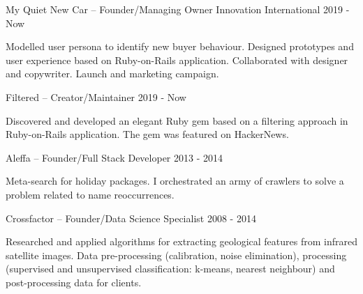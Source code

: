 


\begin{cventries}

  \cventry
    {My Quiet New Car – Founder/Managing Owner} %
    {Innovation} %
    {International} %
    {2019 - Now} %
    {
      \begin{cvitems} %
        \item {Modelled user persona to identify new buyer behaviour. Designed prototypes and user experience based on Ruby-on-Rails application. Collaborated with designer and copywriter. Launch and marketing campaign.}
      \end{cvitems}
    }

    \cventry
    {Filtered – Creator/Maintainer} %
    {} %
    {} %
    {2019 - Now} %
    {
      \begin{cvitems} %
        \item {Discovered and developed an elegant Ruby gem based on a filtering approach in Ruby-on-Rails application. The gem was featured on HackerNews.}
      \end{cvitems}
    }

    \cventry
    {Aleffa – Founder/Full Stack Developer} %
    {} %
    {} %
    {2013 - 2014} %
    {
      \begin{cvitems} %
        \item {Meta-search for holiday packages. I orchestrated an army of crawlers to solve a problem related to name reoccurrences.}
      \end{cvitems}
    }

    \cventry
    {Crossfactor – Founder/Data Science Specialist} %
    {} %
    {} %
    {2008 - 2014} %
    {
      \begin{cvitems} %
        \item {Researched and applied algorithms for extracting geological features from infrared satellite images. Data pre-processing (calibration, noise elimination), processing (supervised and unsupervised classification: k-means, nearest neighbour) and post-processing data for clients.}
      \end{cvitems}
    }


\end{cventries}
